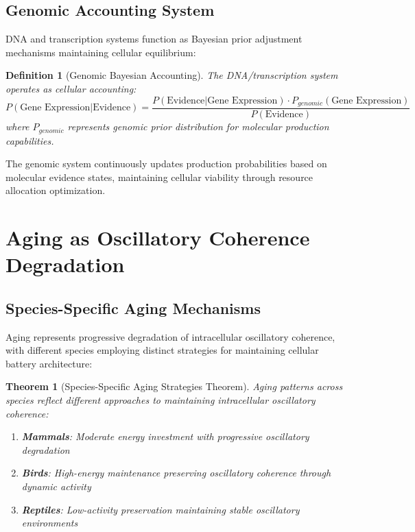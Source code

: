\documentclass[12pt,a4paper]{article}
\newtheorem{theorem}{Theorem}
\newtheorem{definition}{Definition}
\begin{document}
{\subsection{Genomic Accounting System}

DNA and transcription systems function as Bayesian prior adjustment mechanisms maintaining cellular equilibrium:

\begin{definition}[Genomic Bayesian Accounting]
The DNA/transcription system operates as cellular accounting:
\begin{equation}
P(\text{Gene Expression} | \text{Evidence}) = \frac{P(\text{Evidence} | \text{Gene Expression}) \cdot P_{genomic}(\text{Gene Expression})}{P(\text{Evidence})}
\end{equation}
where $P_{genomic}$ represents genomic prior distribution for molecular production capabilities.
\end{definition}

The genomic system continuously updates production probabilities based on molecular evidence states, maintaining cellular viability through resource allocation optimization.

\section{Aging as Oscillatory Coherence Degradation}

\subsection{Species-Specific Aging Mechanisms}

Aging represents progressive degradation of intracellular oscillatory coherence, with different species employing distinct strategies for maintaining cellular battery architecture:

\begin{theorem}[Species-Specific Aging Strategies Theorem]
Aging patterns across species reflect different approaches to maintaining intracellular oscillatory coherence:
\begin{enumerate}
\item \textbf{Mammals}: Moderate energy investment with progressive oscillatory degradation
\item \textbf{Birds}: High-energy maintenance preserving oscillatory coherence through dynamic activity
\item \textbf{Reptiles}: Low-activity preservation maintaining stable oscillatory environments
\end{enumerate}
\end{theorem}

}
\end{document}
